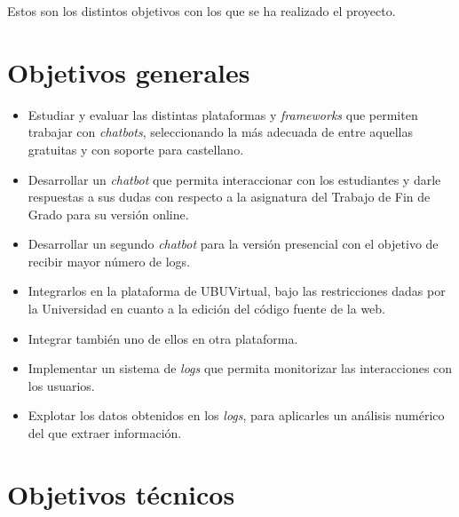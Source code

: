 
Estos son los distintos objetivos con los que se ha realizado el proyecto.

\section{Objetivos generales}\label{objetivos-generales}

\begin{itemize}
	\tightlist
	\item
	Estudiar y evaluar las distintas plataformas y \textit{frameworks} que permiten trabajar con \emph{chatbots}, seleccionando la más adecuada de entre aquellas gratuitas y con soporte para castellano.
	\item
	Desarrollar un \emph{chatbot} que permita interaccionar con los estudiantes y darle respuestas a sus dudas con respecto a la asignatura del Trabajo de Fin de Grado para su versión online.
	\item
	Desarrollar un segundo \emph{chatbot} para la versión presencial con el objetivo de recibir mayor número de logs.
	\item
	Integrarlos en la plataforma de UBUVirtual, bajo las restricciones dadas por la Universidad en cuanto a la edición del código fuente de la web.
	\item 
	Integrar también uno de ellos en otra plataforma.
	\item
	Implementar un sistema de \emph{logs} que permita monitorizar las interacciones con los usuarios.
	\item
	Explotar los datos obtenidos en los \emph{logs}, para aplicarles un análisis numérico del que extraer información. 
\end{itemize}


\section{Objetivos técnicos}\label{objetivos-tecnicos}


